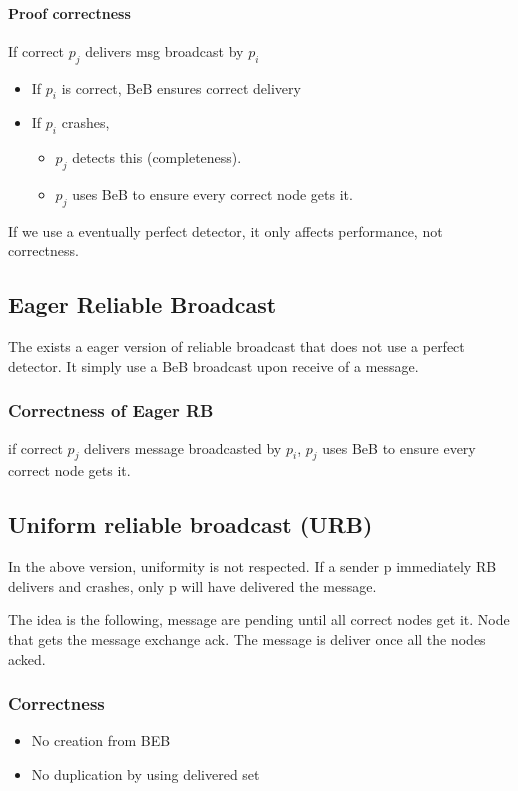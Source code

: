 \paragraph{Proof correctness}
If correct $p_j$ delivers msg broadcast by $p_i$
\begin{itemize}
	\item If $p_i$ is correct, BeB ensures correct delivery
	\item If $p_i$ crashes,
		\begin{itemize}
			\item $p_j$ detects this (completeness).
			\item $p_j$ uses BeB to ensure every correct node gets it.
		\end{itemize}
\end{itemize}
If we use a eventually perfect detector, it only affects
performance, not correctness.


\subsection{Eager Reliable Broadcast}
The exists a eager version of reliable broadcast that does not use a
perfect detector. It simply use a BeB broadcast upon receive of a
message.

    

\subsubsection{Correctness of Eager RB}
if correct $p_j$ delivers message broadcasted by $p_i$,
$p_j$ uses BeB to ensure every correct node gets it.


\subsection{Uniform reliable broadcast (URB)}
In the above version, uniformity is not respected. If a sender
p immediately RB delivers and crashes, only p will have delivered
the message.



The idea is the following, message are pending until all correct
nodes get it. Node that gets the message exchange ack. The
message is deliver once all the nodes acked.

\subsubsection{Correctness}
\begin{itemize}
    \item No creation from BEB
    \item No duplication by using delivered set
\end{itemize}

